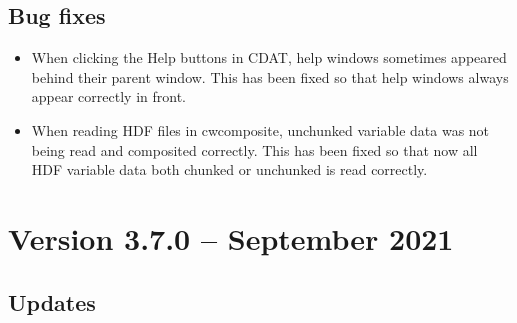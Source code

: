 \subsection*{ Bug fixes}
\begin{itemize}

  \item When clicking the Help buttons in CDAT, help windows sometimes 
  appeared behind their parent window.  This has been fixed so that help
  windows always appear correctly in front.

  \item When reading HDF files in cwcomposite, unchunked variable data was 
  not being read and composited correctly.  This has been fixed so that now all
  HDF variable data both chunked or unchunked is read correctly.

\end{itemize}


\section{Version 3.7.0 -- September 2021}

\subsection*{ Updates}

